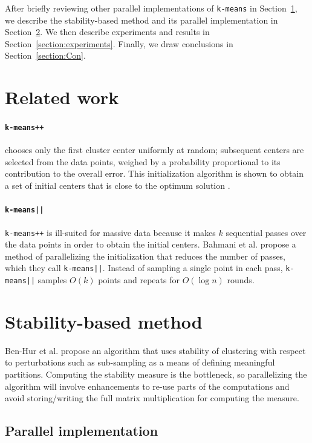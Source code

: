 \documentclass[10pt,twocolumn,letterpaper]{article}
\begin{document}
After briefly reviewing other parallel implementations of \texttt{k-means} in Section~\ref{section:rw}, we describe the stability-based method and its parallel implementation in Section~\ref{section:stability}. We then describe experiments and results in Section~\ref{section:experiments}. Finally, we draw conclusions in Section~\ref{section:Con}.

\section{Related work}  \label{section:rw}
\paragraph{\texttt{k-means++}} chooses only the first cluster center uniformly at random; subsequent centers are selected from the data points, weighed by a probability proportional to its contribution to the overall error. This initialization algorithm is shown to obtain a set of initial centers that is close to the optimum solution \cite{arthur2007}. 

\paragraph{\texttt{k-means||}} \texttt{k-means++} is ill-suited for massive data because it makes $k$ sequential passes over the data points in order to obtain the initial centers. Bahmani et al. \cite{bahmani2012} propose a method of parallelizing the initialization that reduces the number of passes, which they call \texttt{k-means||}. Instead of sampling a single point in each pass, \texttt{k-means||} samples $O(k)$ points and repeats for $O (\log n)$ rounds.

\section{Stability-based method} \label{section:stability}

Ben-Hur et al. \cite{ben2001} propose an algorithm that uses stability of clustering with respect to perturbations such as sub-sampling as a means of defining meaningful partitions.  Computing the stability measure is the bottleneck, so parallelizing the algorithm will involve enhancements to re-use parts of the computations and avoid storing/writing the full matrix multiplication for computing the measure.

\subsection{Parallel implementation} 
\end{document}
